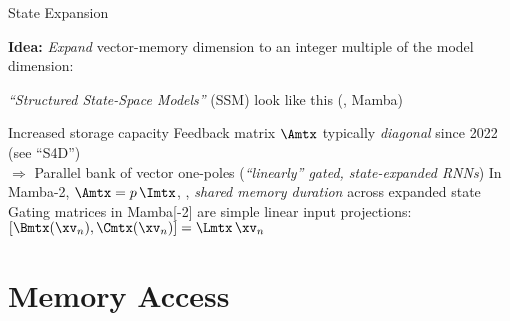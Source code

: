 \begin{slide}[\slideopts]{State Expansion}

\vspace{-1em}

  \textbf{Idea:} \emph{Expand} vector-memory dimension to an integer multiple of the model dimension:
%


\vspace{-1em}

\maybepause

\emph{``Structured State-Space Models''} (SSM) look like this (\eg, Mamba)
\begin{itemize}
  \mpitem Increased storage capacity
  \mpitem Feedback matrix $\Amtx$ typically \emph{diagonal} since 2022 (see ``S4D'')\\
  	  \maybepause $\Rightarrow$ Parallel bank of vector one-poles (\emph{``linearly'' gated, state-expanded RNNs})
  \mpitem In Mamba-2, $\Amtx = p\,\Imtx$, \ie, \emph{shared memory duration} across expanded state
  \mpitem Gating matrices in Mamba[-2] are simple linear input projections:
  $
          [\Bmtx(\xv_n), \Cmtx(\xv_n)] = \Lmtx\,\xv_n  %
  $
\end{itemize}

\end{slide}

\section[\sectopts,toc={Processing}]{Memory Access}


